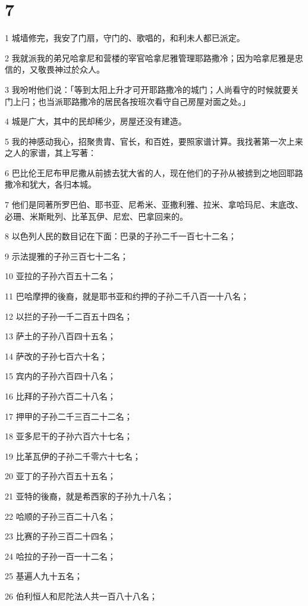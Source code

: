 \chapter{7}

\par 1 城墙修完，我安了门扇，守门的、歌唱的，和利未人都已派定。
\par 2 我就派我的弟兄哈拿尼和营楼的宰官哈拿尼雅管理耶路撒冷；因为哈拿尼雅是忠信的，又敬畏神过於众人。
\par 3 我吩咐他们说：「等到太阳上升才可开耶路撒冷的城门；人尚看守的时候就要关门上闩；也当派耶路撒冷的居民各按班次看守自己房屋对面之处。」
\par 4 城是广大，其中的民却稀少，房屋还没有建造。
\par 5 我的神感动我心，招聚贵胄、官长，和百姓，要照家谱计算。我找著第一次上来之人的家谱，其上写著：
\par 6 巴比伦王尼布甲尼撒从前掳去犹大省的人，现在他们的子孙从被掳到之地回耶路撒冷和犹大，各归本城。
\par 7 他们是同著所罗巴伯、耶书亚、尼希米、亚撒利雅、拉米、拿哈玛尼、末底改、必珊、米斯毗列、比革瓦伊、尼宏、巴拿回来的。
\par 8 以色列人民的数目记在下面：巴录的子孙二千一百七十二名；
\par 9 示法提雅的子孙三百七十二名；
\par 10 亚拉的子孙六百五十二名；
\par 11 巴哈摩押的後裔，就是耶书亚和约押的子孙二千八百一十八名；
\par 12 以拦的子孙一千二百五十四名；
\par 13 萨土的子孙八百四十五名；
\par 14 萨改的子孙七百六十名；
\par 15 宾内的子孙六百四十八名；
\par 16 比拜的子孙六百二十八名；
\par 17 押甲的子孙二千三百二十二名；
\par 18 亚多尼干的子孙六百六十七名；
\par 19 比革瓦伊的子孙二千零六十七名；
\par 20 亚丁的子孙六百五十五名；
\par 21 亚特的後裔，就是希西家的子孙九十八名；
\par 22 哈顺的子孙三百二十八名；
\par 23 比赛的子孙三百二十四名；
\par 24 哈拉的子孙一百一十二名；
\par 25 基遍人九十五名；
\par 26 伯利恒人和尼陀法人共一百八十八名；
